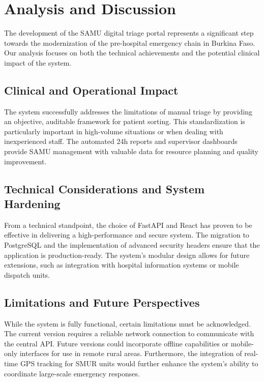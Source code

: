 \section{Analysis and Discussion}
The development of the SAMU digital triage portal represents a significant step towards the modernization of the pre-hospital emergency chain in Burkina Faso. Our analysis focuses on both the technical achievements and the potential clinical impact of the system.

\subsection{Clinical and Operational Impact}
The system successfully addresses the limitations of manual triage by providing an objective, auditable framework for patient sorting. This standardization is particularly important in high-volume situations or when dealing with inexperienced staff. The automated 24h reports and supervisor dashboards provide SAMU management with valuable data for resource planning and quality improvement.

\subsection{Technical Considerations and System Hardening}
From a technical standpoint, the choice of FastAPI and React has proven to be effective in delivering a high-performance and secure system. The migration to PostgreSQL and the implementation of advanced security headers ensure that the application is production-ready. The system's modular design allows for future extensions, such as integration with hospital information systems or mobile dispatch units.

\subsection{Limitations and Future Perspectives}
While the system is fully functional, certain limitations must be acknowledged. The current version requires a reliable network connection to communicate with the central API. Future versions could incorporate offline capabilities or mobile-only interfaces for use in remote rural areas. Furthermore, the integration of real-time GPS tracking for SMUR units would further enhance the system's ability to coordinate large-scale emergency responses.

\clearpage
